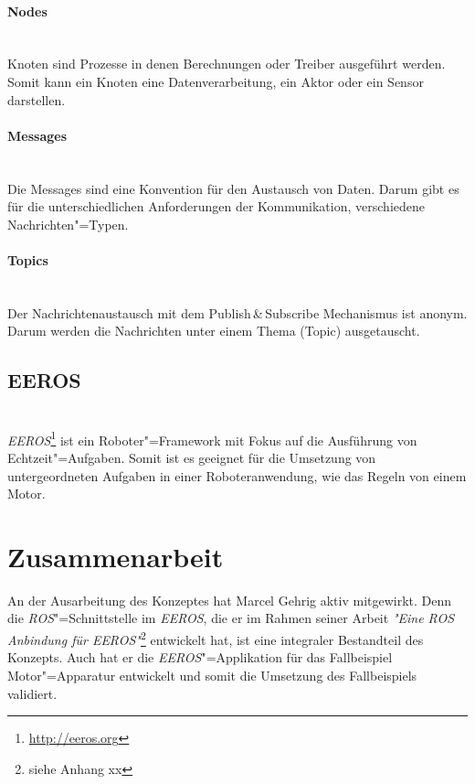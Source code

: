 \paragraph*{Nodes} \mbox{}\\
Knoten sind Prozesse in denen Berechnungen oder Treiber ausgeführt werden. 
Somit kann ein Knoten eine Datenverarbeitung, ein Aktor oder ein Sensor darstellen.  

\paragraph*{Messages} \mbox{}\\
Die Messages sind eine Konvention für den Austausch von Daten.
Darum gibt es für die unterschiedlichen Anforderungen der Kommunikation, verschiedene Nachrichten"=Typen.

\paragraph*{Topics} \mbox{}\\
Der Nachrichtenaustausch mit dem Publish\,\&\,Subscribe Mechanismus ist anonym.
Darum werden die Nachrichten unter einem Thema (Topic) ausgetauscht.

\subsection{EEROS} \mbox{}\\
\textit{EEROS}\footnote{\url{http://eeros.org}} ist ein Roboter"=Framework mit Fokus auf die Ausführung von Echtzeit"=Aufgaben.
Somit ist es geeignet für die Umsetzung von untergeordneten Aufgaben in einer Roboteranwendung, wie das Regeln von einem Motor.


\section{Zusammenarbeit}
An der Ausarbeitung des Konzeptes hat Marcel Gehrig aktiv mitgewirkt.
Denn die \textit{ROS}"=Schnittstelle im \textit{EEROS}, die er im Rahmen seiner Arbeit \textit{\textit{"}Eine ROS Anbindung für EEROS\textit{"}}\footnote{siehe Anhang xx} entwickelt hat, ist eine integraler Bestandteil des Konzepts.
Auch hat er die \textit{EEROS}"=Applikation für das Fallbeispiel Motor"=Apparatur entwickelt und somit die Umsetzung des Fallbeispiels validiert.

